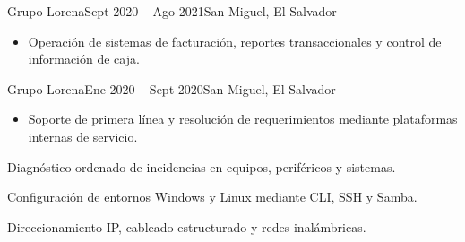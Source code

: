 \documentclass[10pt,a4paper]{Mark_III_Plantilla}
\begin{document}
{Grupo Lorena}{Sept 2020 -- Ago 2021}{San Miguel, El Salvador}
\begin{itemize}
  \item Operación de sistemas de facturación, reportes transaccionales y
  control de información de caja.
\end{itemize}
\divider

{Grupo Lorena}{Ene 2020 -- Sept 2020}{San Miguel, El Salvador}
\begin{itemize}
  \item Soporte de primera línea y resolución de requerimientos mediante
  plataformas internas de servicio.
\end{itemize}


{Diagnóstico ordenado de incidencias en equipos, periféricos y sistemas.}

\divider

{Configuración de entornos Windows y Linux mediante CLI, SSH y Samba.}

\divider

{Direccionamiento IP, cableado estructurado y redes inalámbricas.}
\end{document}
